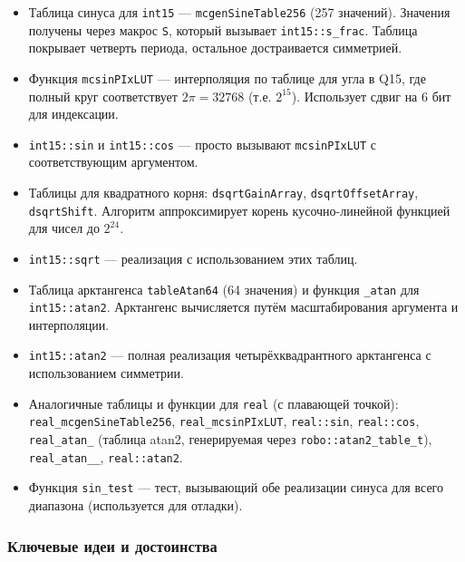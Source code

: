 \documentclass[a4paper,12pt]{article}
\begin{document}
\begin{itemize}
    \item Таблица синуса для \texttt{int15} — \texttt{mcgenSineTable256} (257 значений). Значения получены через макрос \texttt{S}, который вызывает \texttt{int15::s\_frac}. Таблица покрывает четверть периода, остальное достраивается симметрией.
    \item Функция \texttt{mcsinPIxLUT} — интерполяция по таблице для угла в Q15, где полный круг соответствует $2\pi = 32768$ (т.е. $2^{15}$). Использует сдвиг на 6 бит для индексации.
    \item \texttt{int15::sin} и \texttt{int15::cos} — просто вызывают \texttt{mcsinPIxLUT} с соответствующим аргументом.
    \item Таблицы для квадратного корня: \texttt{dsqrtGainArray}, \texttt{dsqrtOffsetArray}, \texttt{dsqrtShift}. Алгоритм аппроксимирует корень кусочно-линейной функцией для чисел до $2^{24}$.
    \item \texttt{int15::sqrt} — реализация с использованием этих таблиц.
    \item Таблица арктангенса \texttt{tableAtan64} (64 значения) и функция \texttt{\_atan} для \texttt{int15::atan2}. Арктангенс вычисляется путём масштабирования аргумента и интерполяции.
    \item \texttt{int15::atan2} — полная реализация четырёхквадрантного арктангенса с использованием симметрии.
    \item Аналогичные таблицы и функции для \texttt{real} (с плавающей точкой): \texttt{real\_mcgenSineTable256}, \texttt{real\_mcsinPIxLUT}, \texttt{real::sin}, \texttt{real::cos}, \texttt{real\_atan\_} (таблица atan2, генерируемая через \texttt{robo::atan2\_table\_t}), \texttt{real\_atan\_\_}, \texttt{real::atan2}.
    \item Функция \texttt{sin\_test} — тест, вызывающий обе реализации синуса для всего диапазона (используется для отладки).
\end{itemize}

\subsubsection{Ключевые идеи и достоинства}
\end{document}
